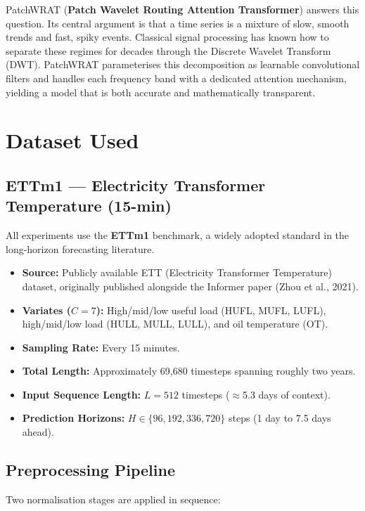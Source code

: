\documentclass[11pt, letterpaper]{article}
\begin{document}
PatchWRAT (\textbf{Patch Wavelet Routing Attention Transformer}) answers this question. Its central argument is that a time series is a mixture of slow, smooth trends and fast, spiky events. Classical signal processing has known how to separate these regimes for decades through the Discrete Wavelet Transform (DWT). PatchWRAT parameterises this decomposition as learnable convolutional filters and handles each frequency band with a dedicated attention mechanism, yielding a model that is both accurate and mathematically transparent.

\section{Dataset Used}

\subsection{ETTm1 --- Electricity Transformer Temperature (15-min)}

All experiments use the \textbf{ETTm1} benchmark, a widely adopted standard in the long-horizon forecasting literature.

\begin{itemize}
  \item \textbf{Source:} Publicly available ETT (Electricity Transformer Temperature) dataset, originally published alongside the Informer paper (Zhou et al., 2021).
  \item \textbf{Variates ($C=7$):} High/mid/low useful load (HUFL, MUFL, LUFL), high/mid/low load (HULL, MULL, LULL), and oil temperature (OT).
  \item \textbf{Sampling Rate:} Every 15 minutes.
  \item \textbf{Total Length:} Approximately 69,680 timesteps spanning roughly two years.
  \item \textbf{Input Sequence Length:} $L = 512$ timesteps ($\approx$5.3 days of context).
  \item \textbf{Prediction Horizons:} $H \in \{96, 192, 336, 720\}$ steps (1 day to 7.5 days ahead).
\end{itemize}

\subsection{Preprocessing Pipeline}

Two normalisation stages are applied in sequence:
\end{document}
